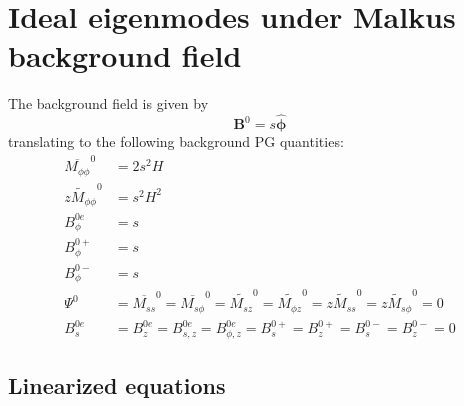 \section{Ideal eigenmodes under Malkus background field}

The background field is given by
\[
    \mathbf{B}^0 = s \hat{\bm{\phi}}
\]
translating to the following background PG quantities:
\begin{equation}
\begin{aligned}
    \overline{M_{\phi\phi}}^0 &= 2 s^{2} H \\ 
    \widetilde{zM_{\phi\phi}}^0 &= s^{2} H^{2} \\ 
    B_{\phi}^{0e} &= s \\ 
    B_\phi^{0+} &= s \\
    B_\phi^{0-} &= s \\
    \Psi^{0} &= \overline{M_{ss}}^0 = \overline{M_{s\phi}}^0 
    = \widetilde{M_{sz}}^0 = \widetilde{M_{\phi z}}^0 = \widetilde{zM_{ss}}^0 = \widetilde{zM_{s\phi}}^0 = 0 \\
    B_{s}^{0e} &= B_{z}^{0e} = B_{s, z}^{0e} = B_{\phi, z}^{0e} = B_s^{0+} = B_z^{0+} = B_s^{0-} = B_z^{0-} = 0
\end{aligned}
\end{equation}

\subsection{Linearized equations}


